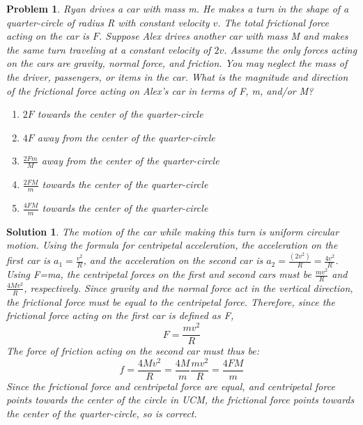 \documentclass[12pt]{article}
\newcommand{\clearpts}{\addtocounter{tpts}{\value{cpts}} \setcounter{cpts}{0}}
\newcommand{\pts}[1]{\clearpts \setcounter{cpts}{#1}}
\newtheorem*{solution}{Solution}
\theoremstyle{mystyle}
\newtheorem{pproblem}{Problem}
\begin{document}
\pts{2}
\begin{pproblem}
    Ryan drives a car with mass m. He makes a turn in the shape of a quarter-circle of radius R with constant velocity $v$. The total frictional force acting on the car is $F$. Suppose Alex drives another car with mass M and makes the same turn traveling at a constant velocity of $2v$. Assume the only forces acting on the cars are gravity, normal force, and friction. You may neglect the mass of the driver, passengers, or items in the car. What is the magnitude and direction of the frictional force acting on Alex's car in terms of F, m, and/or M?
    \begin{enumerate}[label=(\Alph*)]
        \item $2F$ towards the center of the quarter-circle
        \item $4F$ away from the center of the quarter-circle
        \item $\frac{2Fm}{M}$ away from the center of the quarter-circle
        \item $\frac{2FM}{m}$ towards the center of the quarter-circle
        \item $\frac{4FM}{m}$ towards the center of the quarter-circle
    \end{enumerate}
\end{pproblem}
\begin{solution}
    The motion of the car while making this turn is uniform circular motion. Using the formula for centripetal acceleration, the acceleration on the first car is $a_1 = \frac{v^2}{R}$, and the acceleration on the second car is $a_2 = \frac{(2v^2)}{R} = \frac{4v^2}{R}$. Using F=ma, the centripetal forces on the first and second cars must be $\frac{mv^2}{R}$ and $\frac{4Mv^2}{R}$, respectively. Since gravity and the normal force act in the vertical direction, the frictional force must be equal to the centripetal force. Therefore, since the frictional force acting on the first car is defined as F,
    $$F = \frac{mv^2}{R}$$
    The force of friction acting on the second car must thus be:
    $$f = \frac{4Mv^2}{R} = \frac{4M}{m}\frac{mv^2}{R} = \frac{4FM}{m}$$
    Since the frictional force and centripetal force are equal, and centripetal force points towards the center of the circle in UCM, the frictional force points towards the center of the quarter-circle, so  is correct. 
\end{solution}
\end{document}
